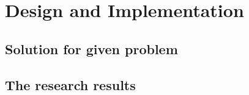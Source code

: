 \chapter{Design and Implementation}
\section{Solution for given problem}
\section{The research results}

\newpage